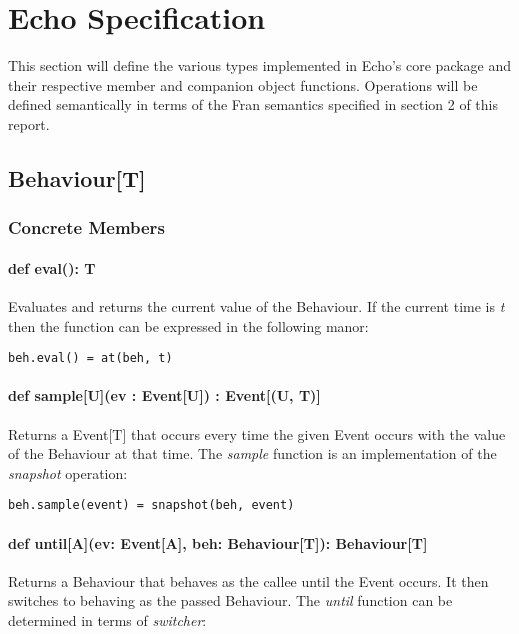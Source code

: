 \chapter{Echo Specification}

  This section will define the various types implemented in Echo's core package and their
  respective member and companion object functions. Operations will be defined 
  semantically in terms of the Fran semantics specified in section 2 of this report.

  \section*{Behaviour[T]}
    \subsection*{Concrete Members}
    \subsubsection*{def eval(): T}
      Evaluates and returns the current value of the
      Behaviour. If the current time is \emph{t} then the
      function can be expressed in the following manor:

\begin{verbatim}
beh.eval() = at(beh, t)
\end{verbatim}      
    
    \subsubsection*{def sample[U](ev : Event[U]) : Event[(U, T)]}
      Returns a Event[T] that occurs every time the given
      Event occurs with the value of the Behaviour at that time.
      The \emph{sample} function is an implementation of the \emph{snapshot} operation:
      
\begin{verbatim}
beh.sample(event) = snapshot(beh, event)
\end{verbatim}
    
    \subsubsection*{def until[A](ev: Event[A], beh: Behaviour[T]): Behaviour[T]}
      Returns a Behaviour that behaves as the callee until the
      Event occurs. It then switches to behaving as the passed
      Behaviour. The \emph{until} function can be determined in terms
      of \emph{switcher}:

